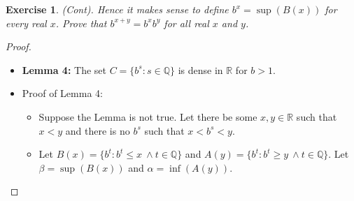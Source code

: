 \documentclass[12pt]{article}
\newtheorem{subexercise}{Exercise}[exercise]
\newcommand{\R}{\mathbb{R}}
\newcommand{\Q}{\mathbb{Q}}
\newcommand{\N}{\mathbb{N}}
\newcommand{\e}{\epsilon}
\begin{document}
\begin{subexercise}
    (Cont). Hence it makes sense to define $b^x = \sup(B(x))$ for every real $x$. Prove that $b^{x+y} = b^x b^y$ for all real $x$ and $y$.
\end{subexercise}

\begin{proof}
    
    \begin{itemize}
    \item \textbf{Lemma 4:} The set $C = \{b^s: s \in \Q\}$ is dense in $\R$ for $b > 1$.
        \item Proof of Lemma 4:
            \begin{itemize}
                \item Suppose the Lemma is not true. Let there be some $x, y \in \R$ such that $x < y$ and there is no $b^s$ such that $x < b^s < y$.
                \item Let $B(x) = \{b^t: b^t \leq x\ \land t \in \Q\}$ and $A(y) = \{b^t: b^t \geq y\ \land t \in \Q\}$. Let $\beta = \sup(B(x))$ and $\alpha = \inf(A(y))$.

\end{itemize}
\end{itemize}
\end{proof}
\end{document}
